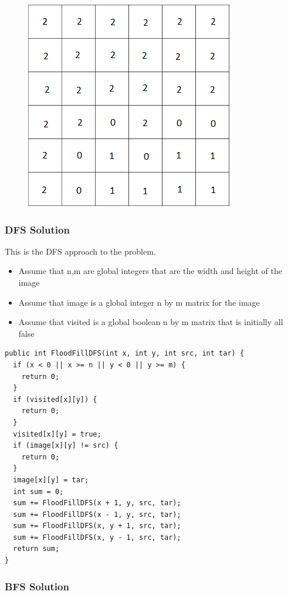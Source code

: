 \documentclass[11pt,oneside]{book}
\makeatletter
\def\maxwidth#1{\ifdim\Gin@nat@width>#1 #1\else\Gin@nat@width\fi}
\makeatother
\begin{document}
\vspace{5px}\begin{figure}[H]\centering
        \includegraphics[width=0.66\maxwidth{\textwidth}]{bucket4.png}
        \end{figure}

\subsubsection{DFS Solution}

This is the DFS approach to the problem.

\begin{itemize}
\item Assume that n,m are global integers that are the width and height of the image
\item Assume that image is a global integer n by m matrix for the image
\item Assume that visited is a global boolean n by m matrix that is initially all false
\end{itemize}

\begin{lstlisting}
public int FloodFillDFS(int x, int y, int src, int tar) {
  if (x < 0 || x >= n || y < 0 || y >= m) {
    return 0;
  }
  if (visited[x][y]) {
    return 0;
  }
  visited[x][y] = true;
  if (image[x][y] != src) {
    return 0;
  }
  image[x][y] = tar;
  int sum = 0;
  sum += FloodFillDFS(x + 1, y, src, tar);
  sum += FloodFillDFS(x - 1, y, src, tar);
  sum += FloodFillDFS(x, y + 1, src, tar);
  sum += FloodFillDFS(x, y - 1, src, tar);
  return sum;
}
\end{lstlisting}

\subsubsection{BFS Solution}
\end{document}
